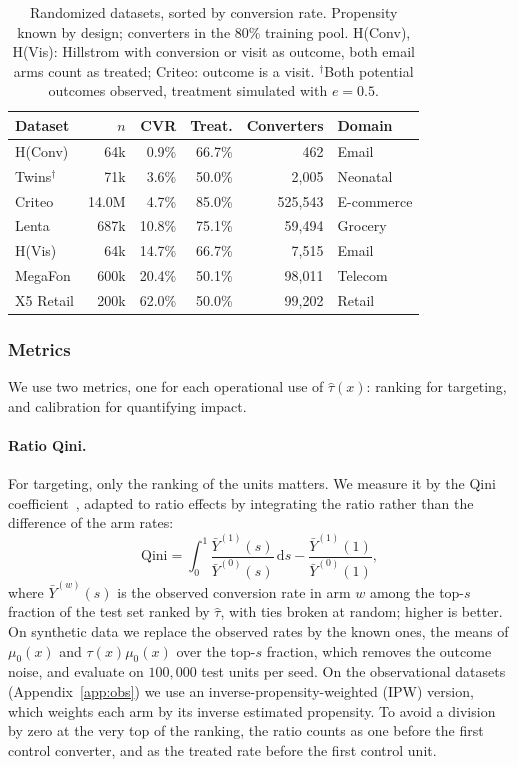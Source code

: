 \documentclass{article}
\begin{document}
\begin{table}[H]
\centering
\caption{Randomized datasets, sorted by conversion rate. Propensity known by
design; converters in the $80\%$ training pool. H(Conv), H(Vis): Hillstrom
with conversion or visit as outcome, both email arms count as treated;
Criteo: outcome is a visit. $^\dagger$Both potential outcomes
observed, treatment simulated with $e = 0.5$.}
\label{tab:rct-v2}
\setlength{\tabcolsep}{6pt}
\begin{tabular}{lrrrrl}
\toprule
Dataset & $n$ & CVR & Treat. & Converters & Domain \\
\midrule
H(Conv) \citep{hillstrom2008} & 64k & 0.9\% & 66.7\% & 462 & Email \\
Twins$^\dagger$ \citep{louizos2017} & 71k & 3.6\% & 50.0\% & 2{,}005 & Neonatal \\
Criteo \citep{diemert2018} & 14.0M & 4.7\% & 85.0\% & 525{,}543 & E-commerce \\
Lenta \citeyearpar{lenta2021} & 687k & 10.8\% & 75.1\% & 59{,}494 & Grocery \\
H(Vis) \citep{hillstrom2008} & 64k & 14.7\% & 66.7\% & 7{,}515 & Email \\
MegaFon \citeyearpar{megafon2019} & 600k & 20.4\% & 50.1\% & 98{,}011 & Telecom \\
X5 Retail \citeyearpar{x5retail2020} & 200k & 62.0\% & 50.0\% & 99{,}202 & Retail \\
\bottomrule
\end{tabular}
\end{table}

\subsubsection{Metrics}
\label{sec:metrics-v2}
We use two metrics, one for each operational use of $\hat\tau(x)$: ranking
for targeting, and calibration for quantifying impact.

\paragraph{Ratio Qini.}
For targeting, only the ranking of the units matters. We measure it by the
Qini coefficient~\citep{radcliffe2011}, adapted to ratio effects by
integrating the ratio rather than the difference of the arm rates:
\[
  \mathrm{Qini} = \int_0^1 \frac{\bar Y^{(1)}(s)}{\bar Y^{(0)}(s)}\,
  \mathrm{d}s - \frac{\bar Y^{(1)}(1)}{\bar Y^{(0)}(1)},
\]
where $\bar Y^{(w)}(s)$ is the observed conversion rate in arm $w$ among the
top-$s$ fraction of the test set ranked by $\hat\tau$, with ties broken at
random; higher is better. On synthetic data we replace the observed rates by the known ones, the means
of $\mu_0(x)$ and $\tau(x)\mu_0(x)$ over the top-$s$ fraction, which removes
the outcome noise, and evaluate on $100{,}000$ test units per seed. On the
observational datasets (Appendix~\ref{app:obs}) we use an inverse-propensity-weighted (IPW) version, which
weights each arm by its inverse estimated propensity. To avoid a division
by zero at the very top of the ranking, the ratio counts as one before the
first control converter, and as the treated rate before the first control
unit.
\end{document}

